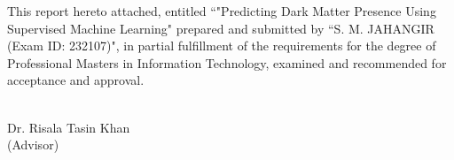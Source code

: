 This report hereto attached, entitled ``"Predicting Dark Matter Presence Using Supervised Machine Learning" prepared and submitted by ``S. M. JAHANGIR (Exam ID: 232107)", in partial fulfillment of the requirements for the degree of Professional Masters in Information Technology, examined and recommended for acceptance and approval. 
\bigskip
\bigskip
\bigskip

 \\
   Dr. Risala Tasin Khan \\ (Advisor)\\

